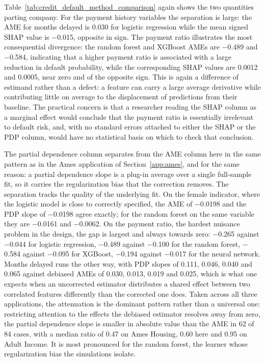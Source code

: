 \documentclass[12pt,a4paper]{article}
\numberwithin{equation}{section}
\theoremstyle{plain}
\theoremstyle{definition}
\begin{document}
	Table~\ref{tab:credit_default_method_comparison} again shows the two quantities parting company. For the payment history variables the separation is large: the AME for months delayed is 0.030 for logistic regression while the mean signed SHAP value is $-$0.015, opposite in sign. The payment ratio illustrates the most consequential divergence: the random forest and XGBoost AMEs are $-$0.489 and $-$0.584, indicating that a higher payment ratio is associated with a large reduction in default probability, while the corresponding SHAP values are 0.0012 and 0.0005, near zero and of the opposite sign. This is again a difference of estimand rather than a defect: a feature can carry a large average derivative while contributing little on average to the displacement of predictions from their baseline. The practical concern is that a researcher reading the SHAP column as a marginal effect would conclude that the payment ratio is essentially irrelevant to default risk, and, with no standard errors attached to either the SHAP or the PDP column, would have no statistical basis on which to check that conclusion.

	The partial dependence column separates from the AME column here in the same pattern as in the Ames application of Section~\ref{app:ames}, and for the same reason: a partial dependence slope is a plug-in average over a single full-sample fit, so it carries the regularization bias that the correction removes. The separation tracks the quality of the underlying fit. On the female indicator, where the logistic model is close to correctly specified, the AME of $-$0.0198 and the PDP slope of $-$0.0198 agree exactly; for the random forest on the same variable they are $-$0.0161 and $-$0.0062. On the payment ratio, the hardest nuisance problem in the design, the gap is largest and always towards zero: $-$0.265 against $-$0.044 for logistic regression, $-$0.489 against $-$0.100 for the random forest, $-$0.584 against $-$0.095 for XGBoost, $-$0.194 against $-$0.017 for the neural network. Months delayed runs the other way, with PDP slopes of 0.111, 0.046, 0.040 and 0.065 against debiased AMEs of 0.030, 0.013, 0.019 and 0.025, which is what one expects when an uncorrected estimator distributes a shared effect between two correlated features differently than the corrected one does. Taken across all three applications, the attenuation is the dominant pattern rather than a universal one: restricting attention to the effects the debiased estimator resolves away from zero, the partial dependence slope is smaller in absolute value than the AME in 62 of 84 cases, with a median ratio of 0.47 on Ames Housing, 0.60 here and 0.95 on Adult Income. It is most pronounced for the random forest, the learner whose regularization bias the simulations isolate.
\end{document}
